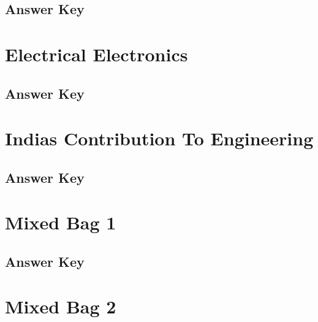 \documentclass[12pt,a4paper]{book}
\begin{document}


\subsection*{Answer Key}



\section{Electrical Electronics}



\subsection*{Answer Key}



\section{Indias Contribution To Engineering}



\subsection*{Answer Key}



\section{Mixed Bag 1}



\subsection*{Answer Key}



\section{Mixed Bag 2}


\end{document}
